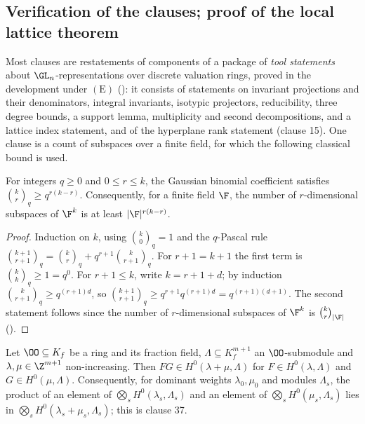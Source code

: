 \subsection{Verification of the clauses; proof of the local lattice theorem}\label{sec:pf:linkG:verif}

Most clauses are restatements of components of a package of \emph{tool statements} about $\GL_n$-representations
over discrete valuation rings, proved in the development under $(\mathrm E)$
(): it consists of statements on invariant projections and
their denominators, integral invariants, isotypic projectors, reducibility, three degree bounds, a support lemma,
multiplicity and second decompositions, and a lattice index statement, and of the hyperplane rank statement
(clause 15). One clause is a count of subspaces over a finite field, for which the following classical bound is
used.

\begin{lemma}\label{pf:linkG:gauss}
For integers $q\ge0$ and $0\le r\le k$, the Gaussian binomial coefficient satisfies $\binom{k}{r}_q\ge q^{r(k-r)}$.
Consequently, for a finite field $\F$, the number of $r$-dimensional subspaces of $\F^k$ is at least
$|\F|^{r(k-r)}$.
\end{lemma}

\begin{proof}
Induction on $k$, using $\binom{k}{0}_q=1$ and the $q$-Pascal rule
$\binom{k+1}{r+1}_q=\binom{k}{r}_q+q^{r+1}\binom{k}{r+1}_q$. For $r+1=k+1$ the first term is $\binom kk_q\ge1=q^0$. For
$r+1\le k$, write $k=r+1+d$; by induction $\binom{k}{r+1}_q\ge q^{(r+1)d}$, so
$\binom{k+1}{r+1}_q\ge q^{r+1}q^{(r+1)d}=q^{(r+1)(d+1)}$. The second statement follows since the number of
$r$-dimensional subspaces of $\F^k$ is $\binom kr_{|\F|}$ ().
\end{proof}

\begin{lemma}\label{pf:linkG:products}
Let $\OO\subseteq K_f$ be a ring and its fraction field, $\Lambda\subseteq K_f^{m+1}$ an $\OO$-submodule and $\lambda,\mu\in\Z^{m+1}$
non-increasing. Then $FG\in H^0(\lambda+\mu,\Lambda)$ for $F\in H^0(\lambda,\Lambda)$ and $G\in H^0(\mu,\Lambda)$.
Consequently, for dominant weights $\lambda_0,\mu_0$ and modules $\Lambda_s$, the product of an element of
$\bigotimes_sH^0(\lambda_s,\Lambda_s)$ and an element of $\bigotimes_sH^0(\mu_s,\Lambda_s)$ lies in
$\bigotimes_sH^0(\lambda_s+\mu_s,\Lambda_s)$; this is clause 37.
\end{lemma}

